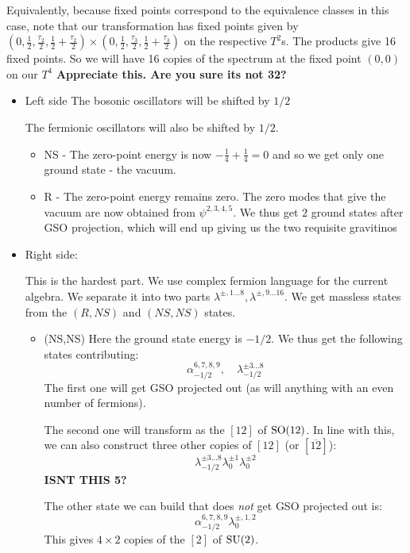 \documentclass[11pt, class=article, crop=false]{standalone}
\begin{document}
\begin{enumerate}
\begin{itemize}
		Equivalently, because fixed points correspond to the equivalence classes in this case, note that our transformation has fixed points given by $(0, \frac12, \frac{\tau_2}2, \frac12 + \frac{ \tau_2}2) \times (0, \frac12, \frac{\tau_3}2, \frac12 + \frac{\tau_3}2)$ on the respective $T^2$s. The products give 16 fixed points. So we will have 16 copies of the spectrum at the fixed point $(0,0)$ on our $T^4$ \textbf{Appreciate this. Are you sure its not 32?}
		
		\begin{itemize}
			\item Left side
			The bosonic oscillators will be shifted by $1/2$ 
			
			The fermionic oscillators will also be shifted by $1/2$. 
			\begin{itemize}
				\item NS - The zero-point energy is now $-\frac14 +\frac14 = 0$ and so we get only one ground state - the vacuum.
				
				\item R - The zero-point energy remains zero. The zero modes that give the vacuum are now obtained from $\psi^{2,3,4,5}$. We thus get $2$ ground states after GSO projection, which will end up giving us the two requisite gravitinos
			\end{itemize}
			
			\item Right side:
			
			This is the hardest part. We use complex fermion language for the current algebra. We separate it into two parts $\lambda^{\pm, 1 \dots 8}, \lambda^{\pm, 9 \dots 16}$. We get massless states from the $(R, NS)$ and $(NS, NS)$ states.
			\begin{itemize}
				\item (NS,NS) Here the ground state energy is $-1/2$. We thus get the following states contributing: 
				\[
					\alpha_{-1/2}^{6,7,8,9}, \quad \lambda^{\pm 3\dots 8}_{-1/2}
				\]
				The first one will get GSO projected out (as will anything with an even number of fermions). 
				
				The second one will transform as the $[12]$ of $\mathrm{SO}(12)$. In line with this, we can also construct three other copies of $[12]$ (or $[\overline{12}]$):
				\[
					\lambda^{\pm 3\dots 8}_{-1/2} \lambda_0^{\pm 1} \lambda_0^{\pm 2}
				\]
				\textbf{ISNT THIS 5?}
				
				The other state we can build that does \emph{not} get GSO projected out is:
				\[
					\alpha_{-1/2}^{6,7,8,9} \lambda_0^{\pm, 1,2}
				\]
				This gives $4 \times 2$ copies of the $[2]$ of $\mathrm{SU}(2)$.
				

\end{itemize}
\end{itemize}
\end{itemize}
\end{enumerate}
\end{document}
